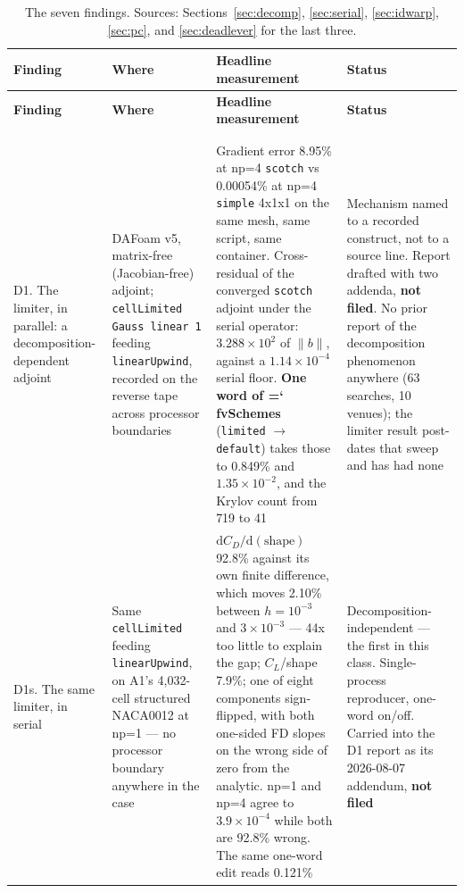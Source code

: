 \documentclass[11pt,a4paper]{article}
\newcommand{\artifact}[1]{{\small\ttfamily\hyphenchar\font=`\-\relax
  \def\_{\textunderscore\allowbreak}#1}}
\begin{document}
{\footnotesize
\begin{longtable}{@{}L{2.4cm}L{3.1cm}L{5.9cm}L{3.2cm}@{}}
\toprule
\textbf{Finding} & \textbf{Where} & \textbf{Headline measurement} & \textbf{Status} \\
\midrule
\endfirsthead
\toprule
\textbf{Finding} & \textbf{Where} & \textbf{Headline measurement} & \textbf{Status} \\
\midrule
\endhead
\bottomrule
\caption{The seven findings. Sources: Sections~\ref{sec:decomp}, \ref{sec:serial},
\ref{sec:idwarp}, \ref{sec:pc}, and \ref{sec:deadlever} for the last three.}\\
\endlastfoot
{}\\
\addlinespace
D1. The limiter, in parallel: a decomposition-dependent adjoint
& DAFoam v5, matrix-free (Jacobian-free) adjoint; \texttt{cellLimited Gauss linear 1} feeding \texttt{linearUpwind}, recorded on the reverse tape across processor boundaries
& Gradient error 8.95\% at np=4 \texttt{scotch} vs 0.00054\% at np=4 \texttt{simple} 4x1x1 on the same mesh, same script, same container. Cross-residual of the converged \texttt{scotch} adjoint under the serial operator: \(3.288\times10^{2}\) of \(\lVert b\rVert\), against a \(1.14\times10^{-4}\) serial floor. \textbf{One word of \artifact{fvSchemes}} (\texttt{limited} \(\rightarrow\) \texttt{default}) takes those to 0.849\% and \(1.35\times10^{-2}\), and the Krylov count from 719 to 41
& Mechanism named to a recorded construct, not to a source line. Report drafted with two addenda, \textbf{not filed}. No prior report of the decomposition phenomenon anywhere (63 searches, 10 venues); the limiter result post-dates that sweep and has had none \\
\addlinespace
D1s. The same limiter, in serial
& Same \texttt{cellLimited} feeding \texttt{linearUpwind}, on A1's 4{,}032-cell structured NACA0012 at np=1 --- no processor boundary anywhere in the case
& \(\mathrm{d}C_D/\mathrm{d}(\mathrm{shape})\) 92.8\% against its own finite difference, which moves 2.10\% between \(h=10^{-3}\) and \(3\times10^{-3}\) --- 44x too little to explain the gap; \(C_L\)/shape 7.9\%; one of eight components sign-flipped, with both one-sided FD slopes on the wrong side of zero from the analytic. np=1 and np=4 agree to \(3.9\times10^{-4}\) while both are 92.8\% wrong. The same one-word edit reads 0.121\%
& Decomposition-independent --- the first in this class. Single-process reproducer, one-word on/off. Carried into the D1 report as its 2026-08-07 addendum, \textbf{not filed} \\

\end{longtable}}
\end{document}
